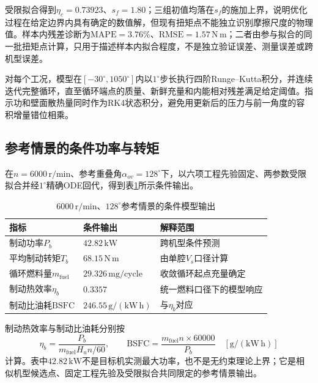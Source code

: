 \documentclass[withoutpreface,bwprint]{cumcmthesis}
\begin{document}
受限拟合得到$\eta_c=0.73923$、$s_f=1.80$；三组初值均落在$s_f$的施加上界，说明优化过程在给定边界内具有确定的数值解，但现有扭矩点不能独立识别摩擦尺度的物理值。样本内残差诊断为$\mathrm{MAPE}=3.76\%$、$\mathrm{RMSE}=1.57\,\mathrm{N\,m}$；二者由参与拟合的同一批扭矩点计算，只用于描述样本内拟合程度，不是独立验证误差、测量误差或跨机型误差。

对每个工况，模型在$[-30^\circ,1050^\circ]$内以$1^\circ$步长执行四阶Runge--Kutta积分，并连续迭代完整循环，直至循环端点的质量、新鲜充量和内能相对残差满足给定阈值。指示功和壁面散热量同时作为RK4状态积分，避免用更新后的压力与前一角度的容积增量错位相乘。

\subsection{参考情景的条件功率与转矩}

在$n=6000\,\mathrm{r/min}$、参考重叠角$\alpha_{ov}=128^\circ$下，以六项工程先验固定、两参数受限拟合并经$1^\circ$精确ODE回代，得到表\ref{tab:q2-reference-result}所示条件输出。

\begin{table}[H]
\centering
\caption{$6000\,\mathrm{r/min}$、$128^\circ$参考情景的条件模型输出}
\label{tab:q2-reference-result}
\begin{tabular}{lll}
\toprule
指标 & 条件输出 & 解释范围\\
\midrule
制动功率$P_b$ & $42.82\,\mathrm{kW}$ & 跨机型条件预测\\
平均制动转矩$T_b$ & $68.15\,\mathrm{N\,m}$ & 由单腔$V_s$口径计算\\
循环燃料量$m_{\mathrm{fuel}}$ & $29.326\,\mathrm{mg/cycle}$ & 收敛循环起点充量确定\\
制动热效率$\eta_b$ & $0.3357$ & 统一燃料口径下的模型响应\\
制动比油耗$\mathrm{BSFC}$ & $246.55\,\mathrm{g/(kW\,h)}$ & 与$\eta_b$对应\\
\bottomrule
\end{tabular}
\end{table}

制动热效率与制动比油耗分别按
\begin{equation}
 \eta_b=\frac{P_b}{m_{\mathrm{fuel}}H_u n/60},\qquad
 \mathrm{BSFC}=\frac{m_{\mathrm{fuel}}n\times60000}{P_b}
 \quad\left[\mathrm{g/(kW\,h)}\right]
 \label{eq:q2-efficiency}
\end{equation}
计算。表中$42.82\,\mathrm{kW}$不是目标机实测最大功率，也不是无约束理论上界；它是相似机型候选点、固定工程先验及受限拟合共同限定的参考情景输出。
\end{document}
